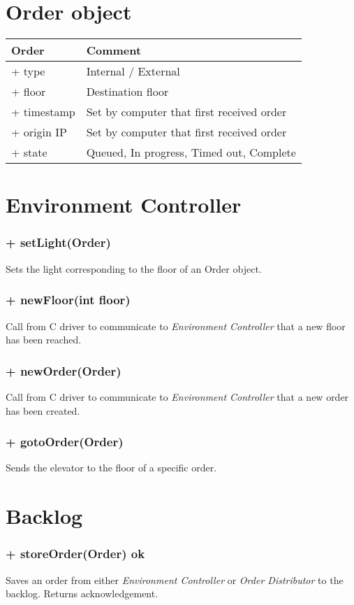\documentclass[11pt,a4paper]{article}
\begin{document}
\section*{Order object}
\begin{tabu}{|X|X|}
\hline
\textbf{Order} & Comment\\ \hline
+ type & Internal / External\\
+ floor & Destination floor\\
+ timestamp & Set by computer that first received order\\
+ origin IP & Set by computer that first received order\\
+ state & Queued, In progress, Timed out, Complete\\ \hline
\end{tabu}
\section*{Environment Controller}
\subsubsection*{+ setLight(Order)}
Sets the light corresponding to the floor of an Order object.
\subsubsection*{+ newFloor(int floor)}
Call from C driver to communicate to \textit{Environment Controller} that a new floor has been reached.
\subsubsection*{+ newOrder(Order)}
Call from C driver to communicate to \textit{Environment Controller} that a new order has been created.
\subsubsection*{+ gotoOrder(Order)}
Sends the elevator to the floor of a specific order.
\section*{Backlog}
\subsubsection*{+ storeOrder(Order) ok}
Saves an order from either \textit{Environment Controller} or \textit{Order Distributor} to the backlog. Returns acknowledgement.
\end{document}
